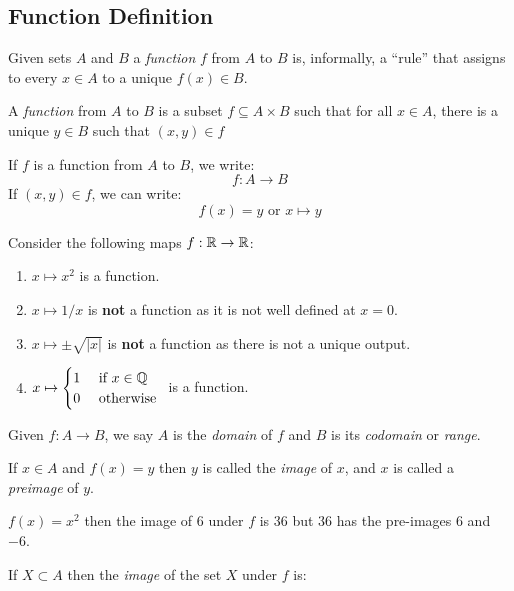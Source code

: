 \documentclass[../main.tex]{subfiles}
\begin{document}
\subsection{Function Definition}
  Given sets $A$ and $B$ a \textit{function} $f$ from $A$ to $B$ is, informally, a ``rule'' that assigns to every $x \in A$ to a unique $f(x) \in B$.
\begin{definition}[Function]
  A \textit{function} from $A$ to $B$ is a subset $f \subseteq A \times B$ such that for all $x \in A$, there is a unique $y \in B$ such that $(x, y) \in f$
\end{definition}
\begin{remark}[Notation]
  If $f$ is a function from $A$ to $B$, we write:
  \[
    f: A \to B
  \]
  If $(x, y) \in f$, we can write:
  \[
    f(x) = y \text{ or } x \mapsto y
  \]
\end{remark}
\begin{example}
  Consider the following maps $f: \mathbb{R} \to \mathbb{R}$:
  \begin{enumerate}
    \item $x \mapsto x^2$ is a function.
    \item $x \mapsto 1/x$ is \textbf{not} a function as it is not well defined at $x = 0$.
    \item $x \mapsto \pm\sqrt{|x|}$ is \textbf{not} a function as there is not a unique output.
    \item $
        x \mapsto \begin{cases}
        1 & \text{ if } x \in \mathbb{Q} \\
        0 & \text{ otherwise }
        \end{cases}
        $ is a function.
  \end{enumerate}
\end{example}
\begin{definition}
  Given $f: A \to B$, we say $A$ is the \textit{domain} of $f$ and $B$ is its \textit{codomain} or \textit{range}.
\end{definition}
\begin{definition}
  If $x \in A$ and $f(x) = y$ then $y$ is called the \textit{image} of $x$, and $x$ is called a \textit{preimage} of $y$.
\end{definition}
\begin{example}
  $f(x) = x^2$ then the image of $6$ under $f$ is $36$ but $36$ has the pre-images $6$ and $-6$.
\end{example}
If $X \subset A$ then the \textit{image} of the set $X$ under $f$ is:
\end{document}
